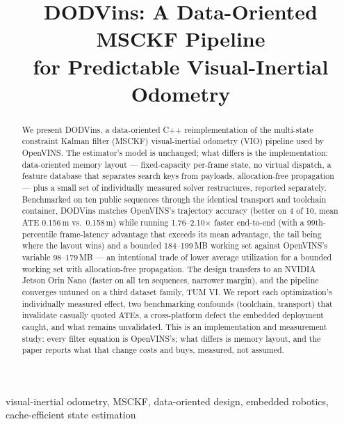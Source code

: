 \documentclass[10pt,conference,letterpaper]{IEEEtran}
\begin{document}
\title{DODVins: A Data-Oriented MSCKF Pipeline\\for Predictable Visual-Inertial Odometry}

\author{
}

\maketitle

\begin{abstract}
We present DODVins, a data-oriented C++ reimplementation of the multi-state
constraint Kalman filter (MSCKF) visual-inertial odometry (VIO) pipeline
used by OpenVINS. The estimator's model is unchanged; what differs is the
implementation: data-oriented memory layout --- fixed-capacity per-frame
state, no virtual dispatch, a feature database that separates search keys
from payloads, allocation-free propagation --- plus a small set of
individually measured solver restructures, reported separately.
Benchmarked on ten public sequences through the identical transport and
toolchain container, DODVins matches OpenVINS's trajectory accuracy (better
on 4 of 10, mean ATE 0.156\,m vs.\ 0.158\,m) while running 1.76--2.10$\times$
faster end-to-end (with a 99th-percentile frame-latency advantage that
exceeds its mean advantage, the tail being where the layout wins) and a
bounded 184--199\,MB working set against OpenVINS's variable 98--179\,MB ---
an intentional trade of lower average utilization for a bounded working
set with allocation-free propagation. The
design transfers to an NVIDIA Jetson Orin Nano (faster on all ten sequences,
narrower margin), and the pipeline converges untuned on a third dataset
family, TUM VI. We report each optimization's individually measured effect,
two benchmarking confounds (toolchain, transport) that invalidate casually
quoted ATEs, a cross-platform defect the embedded deployment caught, and
what remains unvalidated. This is an implementation and measurement study:
every filter equation is OpenVINS's; what differs is memory layout, and the
paper reports what that change costs and buys, measured, not assumed.
\end{abstract}

\begin{IEEEkeywords}
visual-inertial odometry, MSCKF, data-oriented design, embedded robotics, cache-efficient state estimation
\end{IEEEkeywords}
\end{document}
